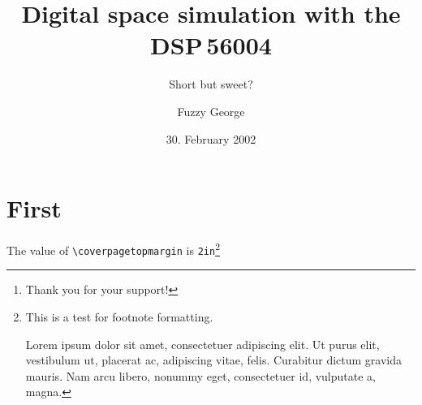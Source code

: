 \documentclass[titlepage=firstiscover]{scrbook}
\renewcommand{\coverpagetopmargin}{2in}
\begin{document}
\extratitle{\textbf{\Huge Extra Title}}
\frontispiece{this is the back of the front}
\titlehead{{\Large Unseen University
\hfill SS~2002\\}
Higher Analytical Institute\\
Mythological Rd\\
34567 Etherworld}
\subject{Dissertation}
\title{Digital space simulation with the DSP\,56004}
\subtitle{Short but sweet?}
\author{Fuzzy George}
\date{30. February 2002}
\publishers{Adviser Prof. John Eccentric Doe\\
Chair Gregory Harris, Industrial and Systems Engineering\thanks{Thank you for your support!}}
\uppertitleback{}
\lowertitleback{}
\dedication{To Cheryl. All my love. Always.}
\maketitle
\tableofcontents
\chapter{First}

The value of \verb|\coverpagetopmargin| is \texttt{\coverpagetopmargin}\footnote{This is a test for footnote formatting.\par Lorem ipsum dolor sit amet, consectetuer adipiscing elit. Ut purus elit, vestibulum ut, placerat ac, adipiscing vitae, felis. Curabitur dictum gravida mauris. Nam arcu libero, nonummy eget, consectetuer id, vulputate a, magna.}

\lipsum[2]

\lipsum[3]

\lipsum[1]
\end{document}
